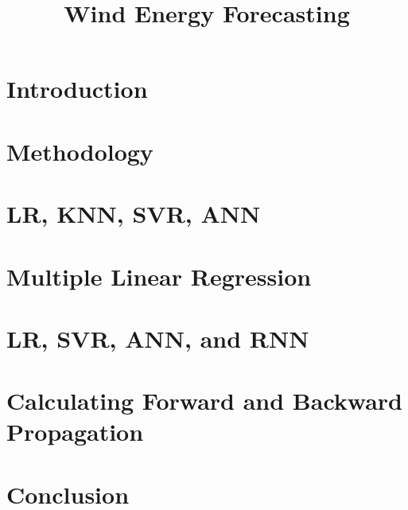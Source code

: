 \documentclass[a4paper, article, oneside, USenglish, IN5460]{memoir}
\title{ Wind Energy Forecasting }
\begin{document}
\shorthandoff{}

\projectfrontpage


\chapter{Introduction}


\chapter{Methodology}

\chapter{LR, KNN, SVR, ANN}

\chapter{Multiple Linear Regression}

\chapter{LR, SVR, ANN, and RNN}

\chapter{Calculating Forward and Backward Propagation}

\chapter{Conclusion}




\printbibliography{}
\end{document}
